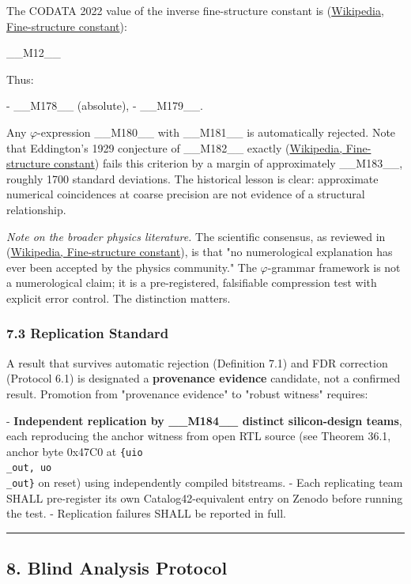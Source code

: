 The CODATA 2022 value of the inverse fine-structure constant is (\href{https://en.wikipedia.org/wiki/Fine-structure\_constant}{Wikipedia, Fine-structure constant}):

\_\_M12\_\_

Thus:

- \_\_M178\_\_ (absolute),
- \_\_M179\_\_.

Any $\varphi$-expression \_\_M180\_\_ with \_\_M181\_\_ is automatically rejected. Note that Eddington's 1929 conjecture of \_\_M182\_\_ exactly (\href{https://en.wikipedia.org/wiki/Fine-structure\_constant}{Wikipedia, Fine-structure constant}) fails this criterion by a margin of approximately \_\_M183\_\_, roughly 1700 standard deviations. The historical lesson is clear: approximate numerical coincidences at coarse precision are not evidence of a structural relationship.

\textit{Note on the broader physics literature.} The scientific consensus, as reviewed in (\href{https://en.wikipedia.org/wiki/Fine-structure\_constant}{Wikipedia, Fine-structure constant}), is that "no numerological explanation has ever been accepted by the physics community." The $\varphi$-grammar framework is not a numerological claim; it is a pre-registered, falsifiable compression test with explicit error control. The distinction matters.

\subsubsection{7.3 Replication Standard}

A result that survives automatic rejection (Definition 7.1) and FDR correction (Protocol 6.1) is designated a \textbf{provenance evidence} candidate, not a confirmed result. Promotion from "provenance evidence" to "robust witness" requires:

- \textbf{Independent replication by \_\_M184\_\_ distinct silicon-design teams}, each reproducing the anchor witness from open RTL source (see Theorem 36.1, anchor byte 0x47C0 at \texttt{\{uio\\_out, uo\\_out\}} on reset) using independently compiled bitstreams.
- Each replicating team SHALL pre-register its own Catalog42-equivalent entry on Zenodo before running the test.
- Replication failures SHALL be reported in full.

\noindent\rule{\textwidth}{0.4pt}

\subsection{8. Blind Analysis Protocol}

